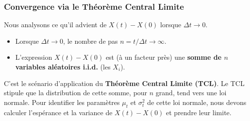 \subsubsection{Convergence via le Théorème Central Limite}

Nous analysons ce qu'il advient de $X(t) - X(0)$ lorsque $\Delta t \to 0$.
\begin{itemize}
    \item Lorsque $\Delta t \to 0$, le nombre de pas $n = t/\Delta t \to \infty$.
    \item L'expression $X(t) - X(0)$ est (à un facteur près) une \textbf{somme de $n$ variables aléatoires i.i.d.} (les $X_i$).
\end{itemize}
C'est le scénario d'application du \textbf{Théorème Central Limite (TCL)}. Le TCL stipule que la distribution de cette somme, pour $n$ grand, tend vers une loi normale. Pour identifier les paramètres $\mu_t$ et $\sigma_t^2$ de cette loi normale, nous devons calculer l'espérance et la variance de $X(t) - X(0)$ et prendre leur limite.

